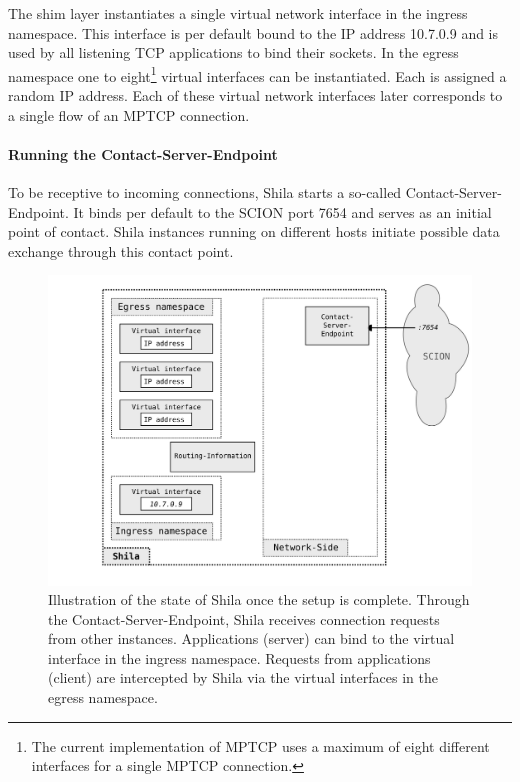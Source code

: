 The shim layer instantiates a single virtual network interface in the ingress namespace. This interface is per default bound to the IP address {\footnotesize 10.7.0.9} and is used by all listening TCP applications to bind their sockets. In the egress namespace one to eight\footnote{The current implementation of MPTCP uses a maximum of eight different interfaces for a single MPTCP connection.} virtual interfaces can be instantiated. Each is assigned a random IP address. Each of these virtual network interfaces later corresponds to a single flow of an MPTCP connection.

\paragraph{Running the Contact-Server-Endpoint} To be receptive to incoming connections, Shila starts a so-called Contact-Server-Endpoint. It binds per default to the SCION port {\footnotesize 7654} and serves as an initial point of contact. Shila instances running on different hosts initiate possible data exchange through this contact point.

\begin{figure}
	\begin{center}
		\def\svgwidth{1\textwidth}
		\includegraphics[scale=0.2]{../illustrations/shilaIntroduction/StateAfterSetup.pdf}   
		\caption[]{Illustration of the state of Shila once the setup is complete. Through the Contact-Server-Endpoint, Shila receives connection requests from other instances. Applications (server) can bind to the virtual interface in the ingress namespace. Requests from applications (client) are intercepted by Shila via the virtual interfaces in the egress namespace.}
		\label{fig:ShilaIllustrationStateAfterSetup}
	\end{center}
\end{figure}

